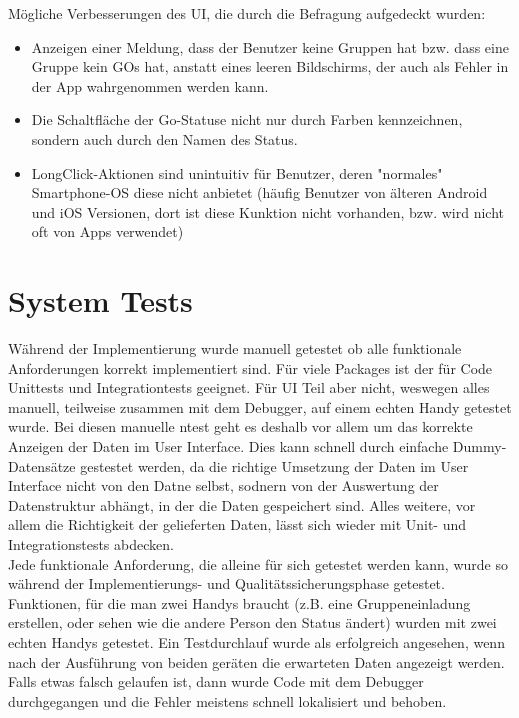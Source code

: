 \documentclass[11pt,a4paper]{scrartcl}
\begin{document}
Mögliche Verbesserungen des UI, die durch die Befragung aufgedeckt wurden:
\begin{itemize}
	\item Anzeigen einer Meldung, dass der Benutzer keine Gruppen hat bzw. dass eine Gruppe kein GOs hat, anstatt eines leeren Bildschirms, der auch als Fehler in der App wahrgenommen werden kann.
	\item Die Schaltfläche der Go-Statuse nicht nur durch Farben kennzeichnen, sondern auch durch den Namen des Status.
	\item LongClick-Aktionen sind unintuitiv für Benutzer, deren "normales" Smartphone-OS diese nicht anbietet (häufig Benutzer von älteren Android und iOS Versionen, dort ist diese Kunktion nicht vorhanden, bzw. wird nicht oft von Apps verwendet)
\end{itemize}                                                                 

\newpage

\section{System Tests}

Während der Implementierung wurde manuell getestet ob alle funktionale Anforderungen korrekt implementiert sind. Für viele Packages ist der für Code Unittests und Integrationtests geeignet. Für UI Teil aber nicht, weswegen alles manuell, teilweise zusammen mit dem Debugger, auf einem echten Handy  getestet wurde. Bei diesen manuelle ntest geht es deshalb vor allem um das korrekte Anzeigen der Daten im User Interface. Dies kann schnell durch einfache Dummy-Datensätze gestestet werden, da die richtige Umsetzung der Daten im User Interface nicht von den Datne selbst, sodnern von der Auswertung der Datenstruktur abhängt, in der die Daten gespeichert sind. Alles weitere, vor allem die Richtigkeit der gelieferten Daten, lässt sich wieder mit Unit- und Integrationstests abdecken.\\

Jede funktionale Anforderung, die alleine für sich getestet werden kann, wurde so während der Implementierungs- und Qualitätssicherungsphase getestet. Funktionen, für die man zwei Handys braucht (z.B. eine Gruppeneinladung erstellen, oder sehen wie die andere Person den Status ändert) wurden mit zwei echten Handys getestet. Ein Testdurchlauf wurde als erfolgreich angesehen, wenn nach der Ausführung von beiden geräten die erwarteten Daten angezeigt werden. Falls etwas falsch gelaufen ist, dann wurde Code mit dem Debugger durchgegangen und die Fehler meistens schnell lokalisiert und behoben.\\
\end{document}
